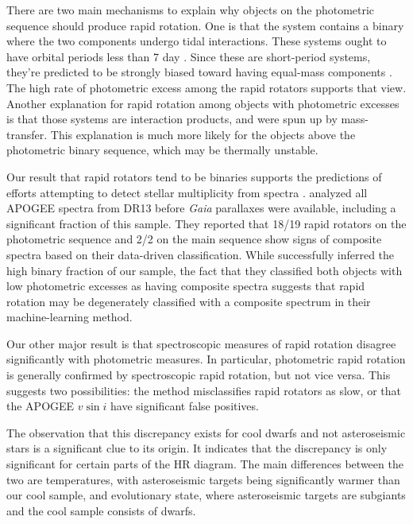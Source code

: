 \documentclass[manuscript]{aastex6}
\newcommand{\vsini}{\ensuremath{v \sin i}}
\newcommand{\Gaia}{\mbox{\textit{Gaia}}}
\begin{document}
There are two main mechanisms to explain why objects on the photometric
sequence should produce rapid rotation. One is that the system contains
a binary where the two components undergo tidal interactions. These
systems ought to have orbital periods less than 7 day
\citep{Raghavan10}. Since these are short-period systems, they're predicted 
to be strongly biased toward having equal-mass components
\citep{Bate02}. The high rate of photometric excess among the rapid
rotators supports that view. Another explanation for rapid rotation
among objects with photometric excesses is that those systems are
interaction products, and were spun up by mass-transfer. This
explanation is much more likely for the objects above the photometric
binary sequence, which may be thermally unstable.

Our result that rapid rotators tend to be binaries supports the
predictions of efforts attempting to detect stellar multiplicity from
spectra \citep{ElBadry18}. \citet{ElBadry18} analyzed all APOGEE spectra
from DR13 before \Gaia{} parallaxes were available, including a
significant fraction of this sample. They
reported that 18/19 rapid rotators on the photometric sequence and 2/2 on 
the main sequence show signs of composite spectra based on their
data-driven classification. While \citet{ElBadry18} successfully inferred the
high binary fraction of our sample, the fact that they classified both objects
with low photometric excesses as having composite spectra suggests that 
rapid rotation may be degenerately classified with a composite spectrum
in their machine-learning method.

Our other major result is that spectroscopic measures of rapid rotation 
disagree significantly with photometric measures. In particular,
photometric rapid rotation is generally confirmed by spectroscopic rapid
rotation, but not vice versa. This suggests two
possibilities: the \citet{McQuillan14} method misclassifies rapid
rotators as slow, or that the APOGEE \vsini{} have significant false
positives.

The observation that this discrepancy exists for cool dwarfs and not
asteroseismic stars is a significant clue to its origin. It indicates 
that the discrepancy is only significant for certain parts of the HR diagram. 
The main differences between the two are temperatures, with asteroseismic 
targets being significantly warmer than our cool sample, and evolutionary 
state, where asteroseismic targets are subgiants and the cool sample consists 
of dwarfs.
\end{document}
